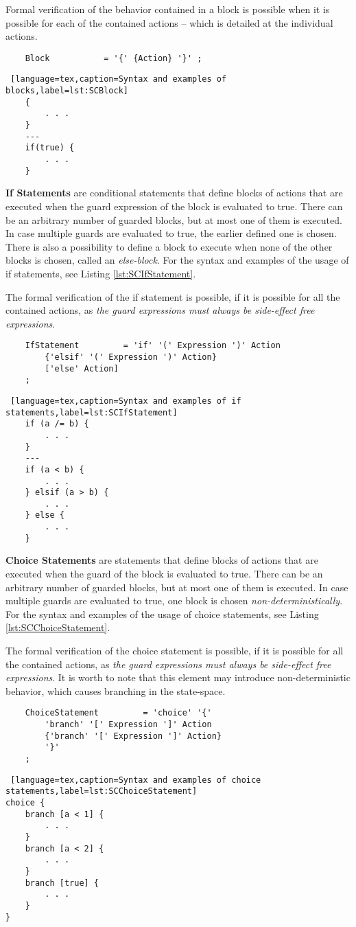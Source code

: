Formal verification of the behavior contained in a block is possible when it is possible for each of the contained actions -- which is detailed at the individual actions.
\bigskip
\begin{lstlisting}
	Block 			= '{' {Action} '}' ;
\end{lstlisting}
\begin{lstlisting} [language=tex,caption=Syntax and examples of blocks,label=lst:SCBlock]
	{
		. . . 
	}
	---
	if(true) {
		. . .
	}
\end{lstlisting}

\bigskip
\textbf{If Statements} are conditional statements that define blocks of actions that are executed when the guard expression of the block is evaluated to true. There can be an arbitrary number of guarded blocks, but at most one of them is executed. In case multiple guards are evaluated to true, the earlier defined one is chosen. There is also a possibility to define a block to execute when none of the other blocks is chosen, called an \textit{else-block}. For the syntax and examples of the usage of if statements, see Listing \ref{lst:SCIfStatement}.

The formal verification of the if statement is possible, if it is possible for all the contained actions, as \textit{the guard expressions must always be side-effect free expressions}.
\bigskip
\begin{lstlisting}
	IfStatement 		= 'if' '(' Expression ')' Action
		{'elsif' '(' Expression ')' Action}
		['else' Action]
	;
\end{lstlisting}
\begin{lstlisting} [language=tex,caption=Syntax and examples of if statements,label=lst:SCIfStatement]
	if (a /= b) {
		. . .
	}
	---
	if (a < b) {
		. . .
	} elsif (a > b) {
		. . .
	} else {
		. . .
	}
\end{lstlisting}

\bigskip
\textbf{Choice Statements} are statements that define blocks of actions that are executed when the guard of the block is evaluated to true. There can be an arbitrary number of guarded blocks, but at most one of them is executed. In case multiple guards are evaluated to true, one block is chosen \textit{non-deterministically}. For the syntax and examples of the usage of choice statements, see Listing \ref{lst:SCChoiceStatement}.

The formal verification of the choice statement is possible, if it is possible for all the contained actions, as \textit{the guard expressions must always be side-effect free expressions}. It is worth to note that this element may introduce non-deterministic behavior, which causes branching in the state-space.
\bigskip
\begin{lstlisting}
	ChoiceStatement 		= 'choice' '{'
		'branch' '[' Expression ']' Action
		{'branch' '[' Expression ']' Action}
		'}'	
	;
\end{lstlisting}
\begin{lstlisting} [language=tex,caption=Syntax and examples of choice statements,label=lst:SCChoiceStatement]
choice {
	branch [a < 1] {
		. . .
	}
	branch [a < 2] {
		. . .
	}
	branch [true] {
		. . .
	}
}
\end{lstlisting}

